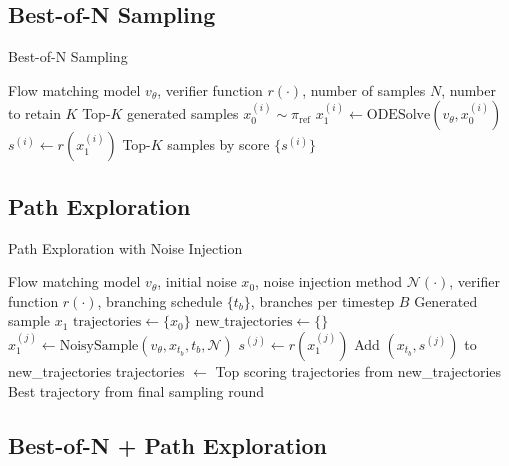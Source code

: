 \documentclass{article}
\begin{document}
\subsection{Best-of-N Sampling}

\begin{algorithm}[H]
\caption{Best-of-N Sampling}
\label{alg:best-of-n}
\begin{algorithmic}[1]
\Require Flow matching model $v_\theta$, verifier function $r(\cdot)$, number of samples $N$, number to retain $K$
\Ensure Top-$K$ generated samples
    \State $x_0^{(i)} \sim \pi_{\text{ref}}$ 
    \State $x_1^{(i)} \leftarrow \text{ODESolve}(v_\theta, x_0^{(i)})$ 
    \State $s^{(i)} \leftarrow r(x_1^{(i)})$ 
\EndFor
\State \Return Top-$K$ samples by score $\{s^{(i)}\}$
\end{algorithmic}
\end{algorithm}

\subsection{Path Exploration}

\begin{algorithm}[H]
\caption{Path Exploration with Noise Injection}
\label{alg:path-exploration}
\begin{algorithmic}[1]
\Require Flow matching model $v_\theta$, initial noise $x_0$, noise injection method $\mathcal{N}(\cdot)$, verifier function $r(\cdot)$, branching schedule $\{t_b\}$, branches per timestep $B$
\Ensure Generated sample $x_1$
\State $\text{trajectories} \leftarrow \{x_0\}$ 
    \State $\text{new\_trajectories} \leftarrow \{\}$
            \State $x_1^{(j)} \leftarrow \text{NoisySample}(v_\theta, x_{t_b}, t_b, \mathcal{N})$ 
            \State $s^{(j)} \leftarrow r(x_1^{(j)})$ 
            \State Add $(x_{t_b}, s^{(j)})$ to new\_trajectories
        \EndFor
    \EndFor
    \State trajectories $\leftarrow$ Top scoring trajectories from new\_trajectories
\EndFor
\State \Return Best trajectory from final sampling round
\end{algorithmic}
\end{algorithm}

\subsection{Best-of-N + Path Exploration}
\end{document}
